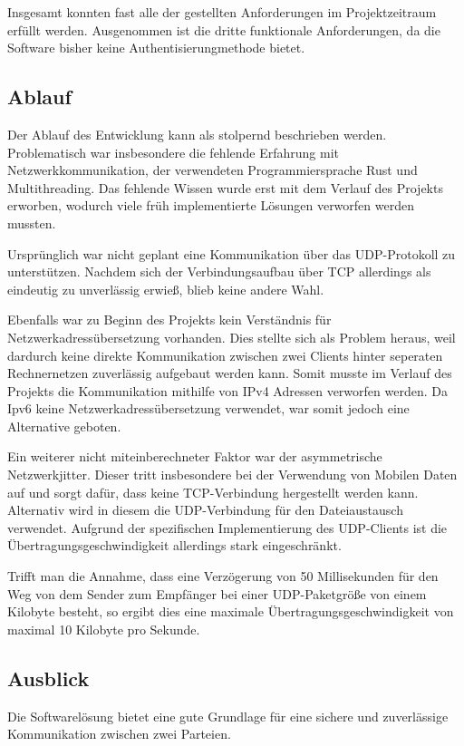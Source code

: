 Insgesamt konnten fast alle der gestellten Anforderungen im Projektzeitraum erfüllt werden. Ausgenommen ist die dritte funktionale Anforderungen, da die Software bisher keine Authentisierungmethode bietet.

\subsection{Ablauf}
Der Ablauf des Entwicklung kann als stolpernd beschrieben werden. Problematisch war insbesondere die fehlende Erfahrung mit Netzwerkkommunikation, der verwendeten Programmiersprache Rust und Multithreading. Das fehlende Wissen wurde erst mit dem Verlauf des Projekts erworben, wodurch viele früh implementierte Lösungen verworfen werden mussten.

Ursprünglich war nicht geplant eine Kommunikation über das UDP-Protokoll zu unterstützen. Nachdem sich der Verbindungsaufbau über TCP allerdings als eindeutig zu unverlässig erwieß, blieb keine andere Wahl.

Ebenfalls war zu Beginn des Projekts kein Verständnis für Netzwerkadressübersetzung vorhanden. Dies stellte sich als Problem heraus, weil dardurch keine direkte Kommunikation zwischen zwei Clients hinter seperaten Rechnernetzen zuverlässig aufgebaut werden kann. Somit musste im Verlauf des Projekts die Kommunikation mithilfe von IPv4 Adressen verworfen werden. Da Ipv6 keine Netzwerkadressübersetzung verwendet, war somit jedoch eine Alternative geboten.

Ein weiterer nicht miteinberechneter Faktor war der asymmetrische Netzwerkjitter. Dieser tritt insbesondere bei der Verwendung von Mobilen Daten auf und sorgt dafür, dass keine TCP-Verbindung hergestellt werden kann. Alternativ wird in diesem die UDP-Verbindung für den Dateiaustausch verwendet. Aufgrund der spezifischen Implementierung des UDP-Clients ist die Übertragungsgeschwindigkeit allerdings stark eingeschränkt.

Trifft man die Annahme, dass eine Verzögerung von 50 Millisekunden für den Weg von dem Sender zum Empfänger bei einer UDP-Paketgröße von einem Kilobyte besteht, so ergibt dies eine maximale Übertragungsgeschwindigkeit von maximal 10 Kilobyte pro Sekunde.

\subsection{Ausblick}
Die Softwarelösung bietet eine gute Grundlage für eine sichere und zuverlässige Kommunikation zwischen zwei Parteien. 